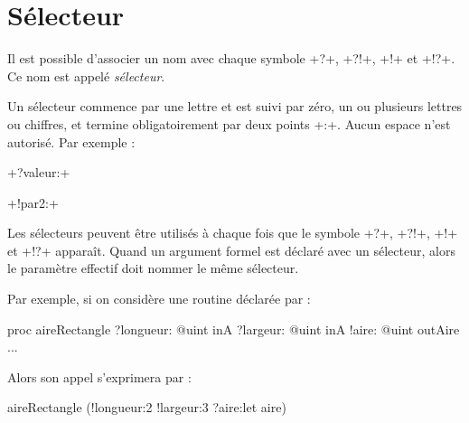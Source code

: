 








\section{Sélecteur}

Il est possible d'associer un nom avec chaque symbole \ggs+?+, \ggs+?!+, \ggs+!+ et \ggs+!?+. Ce nom est appelé \emph{sélecteur}.

Un sélecteur commence par une lettre et est suivi par zéro, un ou plusieurs lettres ou chiffres, et termine obligatoirement par deux points \ggs+:+. Aucun espace n'est autorisé. Par exemple :

\ggs+?valeur:+

\ggs+!par2:+

Les sélecteurs peuvent être utilisés à chaque fois que le symbole \ggs+?+, \ggs+?!+, \ggs+!+ et \ggs+!?+ apparaît. Quand un argument formel est déclaré avec un sélecteur, alors le paramètre effectif doit nommer le même sélecteur.

Par exemple, si on considère une routine déclarée par :

\begin{galgas}
proc aireRectangle
  ?longueur: @uint inA
  ?largeur: @uint inA
  !aire: @uint outAire 
{
  ...
}
\end{galgas}

Alors son appel s'exprimera par :
\begin{galgas}
  aireRectangle (!longueur:2 !largeur:3 ?aire:let aire) 
\end{galgas}



